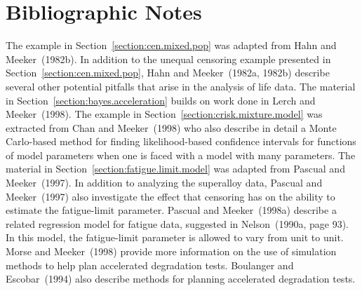 \section*{Bibliographic Notes}

The example in Section~\ref{section:cen.mixed.pop} was adapted from
Hahn and Meeker~(1982b).  In addition to the unequal censoring
example presented in Section~\ref{section:cen.mixed.pop}, Hahn and
Meeker~(1982a, 1982b) describe several other potential pitfalls that
arise in the analysis of life data.  The material in
Section~\ref{section:bayes.acceleration} builds on work done in
Lerch and Meeker~(1998).  The example in
Section~\ref{section:crisk.mixture.model} was extracted from Chan and
Meeker~(1998) who also describe in detail a Monte Carlo-based method
for finding likelihood-based confidence intervals for functions of
model parameters when one is faced with a model with many
parameters.  The material in
Section~\ref{section:fatigue.limit.model} was adapted from Pascual
and Meeker~(1997).  In addition to analyzing the superalloy data,
Pascual and Meeker~(1997) also investigate the effect that censoring
has on the ability to estimate the fatigue-limit parameter. Pascual
and Meeker~(1998a) describe a related regression model for fatigue
data, suggested in Nelson~(1990a, page 93). In this model, the
fatigue-limit parameter is allowed to vary from unit to unit.  Morse
and Meeker~(1998) provide more information on the use of simulation
methods to help plan accelerated degradation tests. Boulanger and
Escobar~(1994) also describe methods for planning accelerated
degradation tests.
